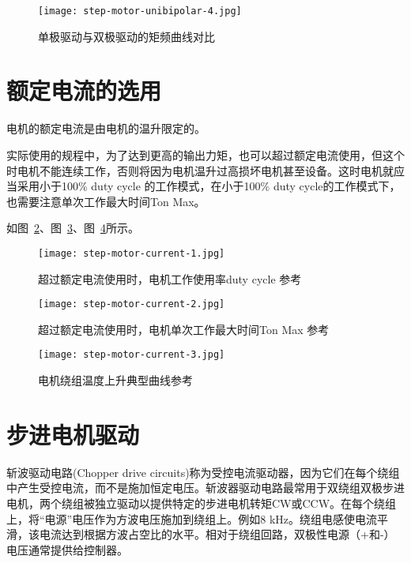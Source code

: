 \begin{figure}[htbp]
    \centering
    \texttt{[image: step-motor-unibipolar-4.jpg]}
    \caption{单极驱动与双极驱动的矩频曲线对比}
    \label{fig:step-motor-unibipolar-4}
\end{figure}

\section{额定电流的选用}

电机的额定电流是由电机的温升限定的。

实际使用的规程中，为了达到更高的输出力矩，也可以超过额定电流使用，但这个时电机不能连续工作，否则将因为电机温升过高损坏电机甚至设备。这时电机就应当采用小于100\% duty cycle 的工作模式，在小于100\% duty cycle的工作模式下，也需要注意单次工作最大时间Ton Max。

如图~\ref{fig:step-motor-current-1}、图~\ref{fig:step-motor-current-2}、图~\ref{fig:step-motor-current-3}所示。

\begin{figure}[htbp]
    \centering
    \texttt{[image: step-motor-current-1.jpg]}
    \caption{超过额定电流使用时，电机工作使用率duty cycle 参考}
    \label{fig:step-motor-current-1}
\end{figure}

\begin{figure}[htbp]
    \centering
    \texttt{[image: step-motor-current-2.jpg]}
    \caption{超过额定电流使用时，电机单次工作最大时间Ton Max 参考}
    \label{fig:step-motor-current-2}
\end{figure}

\begin{figure}[htbp]
    \centering
    \texttt{[image: step-motor-current-3.jpg]}
    \caption{电机绕组温度上升典型曲线参考}
    \label{fig:step-motor-current-3}
\end{figure}

\section{步进电机驱动}

斩波驱动电路(Chopper drive circuits)称为受控电流驱动器，因为它们在每个绕组中产生受控电流，而不是施加恒定电压。斩波器驱动电路最常用于双绕组双极步进电机，两个绕组被独立驱动以提供特定的步进电机转矩CW或CCW。在每个绕组上，将“电源”电压作为方波电压施加到绕组上。例如8 kHz。绕组电感使电流平滑，该电流达到根据方波占空比的水平。相对于绕组回路，双极性电源（+和-）电压通常提供给控制器。

